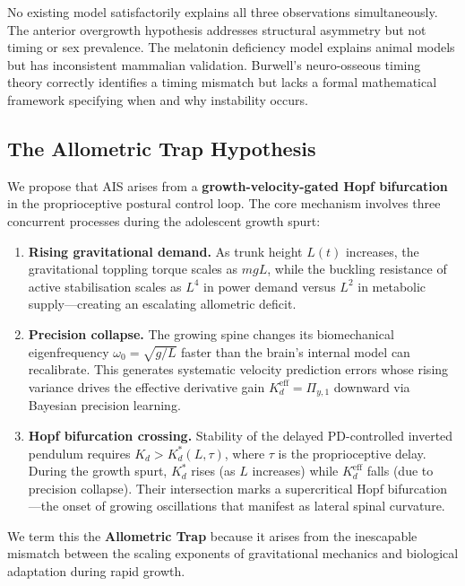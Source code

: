 \documentclass[12pt, letterpaper]{article}
\newcommand{\Kd}{K_d}
\newcommand{\Kdcrit}{K_d^{*}}
\newcommand{\Kdeff}{K_d^{\mathrm{eff}}}
\newcommand{\Piy}{\Pi_{y,1}}
\begin{document}
No existing model satisfactorily explains all three observations simultaneously.
The anterior overgrowth hypothesis \citep{Castelein2005} addresses structural
asymmetry but not timing or sex prevalence. The melatonin deficiency model
\citep{Machida1993} explains animal models but has inconsistent mammalian
validation. Burwell's neuro-osseous timing theory \citep{Burwell2009} correctly
identifies a timing mismatch but lacks a formal mathematical framework specifying
when and why instability occurs.

\subsection{The Allometric Trap Hypothesis}

We propose that AIS arises from a \textbf{growth-velocity-gated Hopf
bifurcation} in the proprioceptive postural control loop. The core mechanism
involves three concurrent processes during the adolescent growth spurt:

\begin{enumerate}[label=\arabic*.]
  \item \textbf{Rising gravitational demand.} As trunk height $L(t)$ increases,
    the gravitational toppling torque scales as $mgL$, while the buckling
    resistance of active stabilisation scales as $L^{4}$ in power demand versus
    $L^{2}$ in metabolic supply---creating an escalating allometric deficit.

  \item \textbf{Precision collapse.} The growing spine changes its biomechanical
    eigenfrequency $\omega_0 = \sqrt{g/L}$ faster than the brain's internal
    model can recalibrate. This generates systematic velocity prediction errors
    whose rising variance drives the effective derivative gain
    $\Kdeff = \Piy$ downward via Bayesian precision learning.

  \item \textbf{Hopf bifurcation crossing.} Stability of the delayed
    PD-controlled inverted pendulum requires $\Kd > \Kdcrit(L, \tau)$, where
    $\tau$ is the proprioceptive delay. During the growth spurt, $\Kdcrit$ rises
    (as $L$ increases) while $\Kdeff$ falls (due to precision collapse). Their
    intersection marks a supercritical Hopf bifurcation---the onset of growing
    oscillations that manifest as lateral spinal curvature.
\end{enumerate}

We term this the \textbf{Allometric Trap} because it arises from the
inescapable mismatch between the scaling exponents of gravitational mechanics
and biological adaptation during rapid growth.
\end{document}

